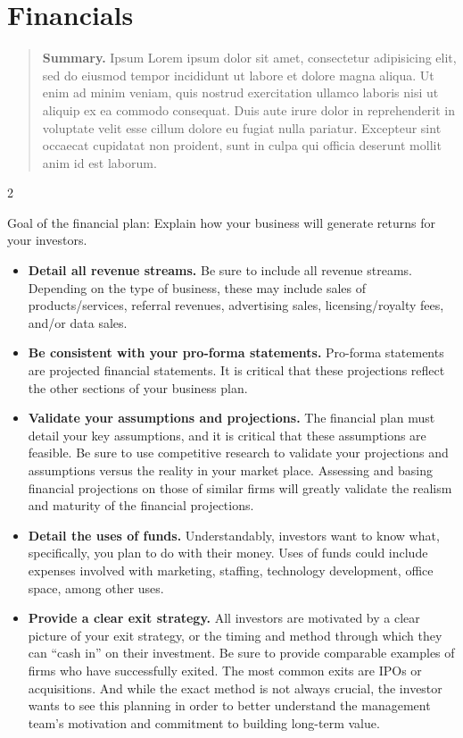 \documentclass[9pt,]{book}
\begin{document}
\hypertarget{financials}{%
\chapter{Financials}\label{financials}}

\begin{quote}
\textbf{Summary.} Ipsum Lorem ipsum dolor sit amet, consectetur
adipisicing elit, sed do eiusmod tempor incididunt ut labore et dolore
magna aliqua. Ut enim ad minim veniam, quis nostrud exercitation ullamco
laboris nisi ut aliquip ex ea commodo consequat. Duis aute irure dolor
in reprehenderit in voluptate velit esse cillum dolore eu fugiat nulla
pariatur. Excepteur sint occaecat cupidatat non proident, sunt in culpa
qui officia deserunt mollit anim id est laborum.
\end{quote}

\begin {multicols}{2}

Goal of the financial plan: Explain how your business will generate
returns for your investors.

\begin{itemize}
\item
  \textbf{Detail all revenue streams.} Be sure to include all revenue
  streams. Depending on the type of business, these may include sales of
  products/services, referral revenues, advertising sales,
  licensing/royalty fees, and/or data sales.
\item
  \textbf{Be consistent with your pro-forma statements.} Pro-forma
  statements are projected financial statements. It is critical that
  these projections reflect the other sections of your business plan.
\item
  \textbf{Validate your assumptions and projections.} The financial plan
  must detail your key assumptions, and it is critical that these
  assumptions are feasible. Be sure to use competitive research to
  validate your projections and assumptions versus the reality in your
  market place. Assessing and basing financial projections on those of
  similar firms will greatly validate the realism and maturity of the
  financial projections.
\item
  \textbf{Detail the uses of funds.} Understandably, investors want to
  know what, specifically, you plan to do with their money. Uses of
  funds could include expenses involved with marketing, staffing,
  technology development, office space, among other uses.
\item
  \textbf{Provide a clear exit strategy.} All investors are motivated by
  a clear picture of your exit strategy, or the timing and method
  through which they can ``cash in'' on their investment. Be sure to
  provide comparable examples of firms who have successfully exited. The
  most common exits are IPOs or acquisitions. And while the exact method
  is not always crucial, the investor wants to see this planning in
  order to better understand the management team's motivation and
  commitment to building long-term value.
\end{itemize}

\end {multicols}
\end{document}
